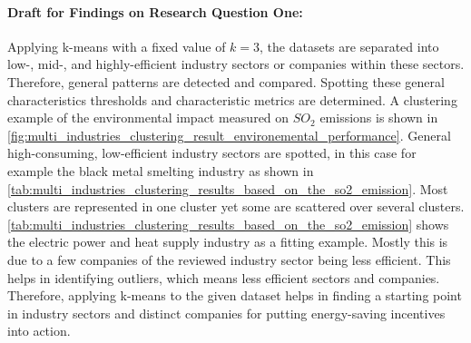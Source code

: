\paragraph*{Draft for Findings on Research Question One:}
Applying k-means with a fixed value of $k=3$, the datasets are separated into low-, mid-, and highly-efficient industry sectors or companies within these sectors.
Therefore, general patterns are detected and compared.
Spotting these general characteristics thresholds and characteristic metrics are determined.
A clustering example of the environmental impact measured on $SO_2$ emissions is shown in \autoref{fig:multi_industries_clustering_result_environemental_performance}.
General high-consuming, low-efficient industry sectors are spotted, in this case for example the black metal smelting industry as shown in \autoref{tab:multi_industries_clustering_results_based_on_the_so2_emission}.
Most clusters are represented in one cluster yet some are scattered over several clusters.
\autoref{tab:multi_industries_clustering_results_based_on_the_so2_emission} shows the electric power and heat supply industry as a fitting example.
Mostly this is due to a few companies of the reviewed industry sector being less efficient.
This helps in identifying outliers, which means less efficient sectors and companies.
Therefore, applying k-means to the given dataset helps in finding a starting point in industry sectors and distinct companies for putting energy-saving incentives into action.

